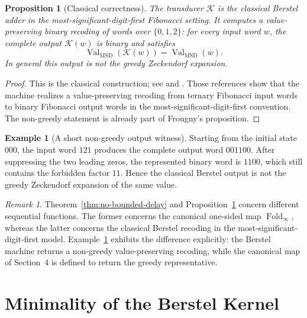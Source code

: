 \documentclass[11pt,letterpaper]{article}
\numberwithin{equation}{section}
\theoremstyle{plain}
\newtheorem{proposition}[theorem]{Proposition}
\theoremstyle{definition}
\newtheorem{example}[theorem]{Example}
\theoremstyle{remark}
\newtheorem{remark}[theorem]{Remark}
\DeclareMathOperator{\Val}{Val}
\DeclareMathOperator{\Fold}{Fold}
\begin{document}
\begin{proposition}[Classical correctness]\label{prop:classical-berstel-correctness}
The transducer $\mathcal K$ is the classical Berstel adder in the
most-significant-digit-first Fibonacci setting.  It computes a value-preserving
binary recoding of words over $\{0,1,2\}$: for every input word $w$, the
complete output $\mathcal K(w)$ is binary and satisfies
\[
\Val_{\mathrm{MSD}}(\mathcal K(w))=\Val_{\mathrm{MSD}}(w).
\]
In general this output is not the greedy Zeckendorf expansion.
\end{proposition}

\begin{proof}
This is the classical construction; see
\cite[Prop.~13]{Frougny1999OnlineAddition} and
\cite[Thm.~3.1]{LabbeLepsova2023FibonacciTwosComplement}.  Those references
show that the machine realizes a value-preserving recoding from ternary
Fibonacci input words to binary Fibonacci output words in the
most-significant-digit-first convention.  The non-greedy statement is already
part of Frougny's proposition.
\end{proof}

\begin{example}[A short non-greedy output witness]\label{ex:berstel-nongreedy}
Starting from the initial state $000$, the input word $121$ produces the
complete output word $001100$.  After suppressing the two leading zeros, the
represented binary word is $1100$, which still contains the forbidden factor
$11$.  Hence the classical Berstel output is not the greedy Zeckendorf
expansion of the same value.
\end{example}

\begin{remark}
Theorem~\ref{thm:no-bounded-delay} and
Proposition~\ref{prop:classical-berstel-correctness} concern different
sequential functions.  The former concerns the canonical one-sided map
$\Fold_\infty$, whereas the latter concerns the classical Berstel recoding in
the most-significant-digit-first model.  Example~\ref{ex:berstel-nongreedy}
exhibits the difference
explicitly: the Berstel machine returns a non-greedy value-preserving recoding,
while the canonical map of Section~4 is defined to return the greedy
representative.
\end{remark}

\section{Minimality of the Berstel Kernel}\label{sec:minimality}
\end{document}
